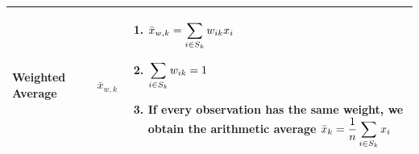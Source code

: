 \begin{customArrayStretch}{1.3}
\begin{longtable}{>{\RaggedRight\arraybackslash}p{4cm} >{\centering\arraybackslash}p{0.5cm} p{10.5cm}}
\textbf{Weighted Average} &
    $\bar{x}_{w,k}$ &
    \begin{minipage}{10.3cm}
        \vspace{0.15cm}
        \begin{enumerate}
            \item $
                \bar{x}_{w,k}
                = \displaystyle\sum_{i \in S_k} w_{ik}x_i
            $
            \hfill \cite{statistics/book/Statistics-for-Data-Scientists/Maurits-Kaptein}

            \item $
                \displaystyle\sum_{i \in S_k} w_{ik} = 1
            $
            \hfill \cite{statistics/book/Statistics-for-Data-Scientists/Maurits-Kaptein}

            \item If every observation has the same weight, we obtain the arithmetic average $\bar{x}_k = \dfrac{1}{n} \displaystyle\sum_{i \in S_k} x_i$
            \hfill \cite{statistics/book/Statistics-for-Data-Scientists/Maurits-Kaptein}

        \end{enumerate}
        \vspace{0.15cm}
    \end{minipage} 
    \\ \hline


\end{longtable}
\end{customArrayStretch}


